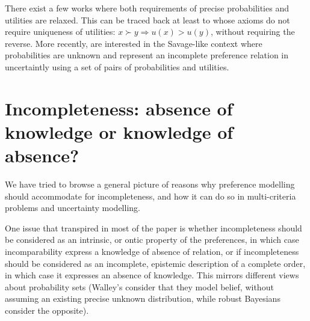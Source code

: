 \documentclass[french, english]{llncs}
\begin{document}
	There exist a few works where both requirements of precise probabilities and utilities are relaxed. This can be traced back at least to \citet{aumann_utility_1962} whose axioms do not require uniqueness of utilities: $x \succ y ⇒ u(x) > u(y)$, without requiring the reverse. More recently, \citet{galaabaatar_subjective_2013} are interested in the Savage-like context where probabilities are unknown and represent an incomplete preference relation in uncertaintly using a set of pairs of probabilities and utilities.


	\section{Incompleteness: absence of knowledge or knowledge of absence?}
	
	We have tried to browse a general picture of reasons why preference modelling should accommodate for incompleteness, and how it can do so in multi-criteria problems and uncertainty modelling. 
	
	One issue that transpired in most of the paper is whether incompleteness should be considered as an intrinsic, or ontic property of the preferences, in which case incomparability express a knowledge of absence of relation, or if incompleteness should be considered as an incomplete, epistemic description of a complete order, in which case it expresses an absence of knowledge. This mirrors different views about probability sets (Walley's consider that they model belief, without assuming an existing precise unknown distribution, while robust Bayesians consider the opposite). 
	
\end{document}

